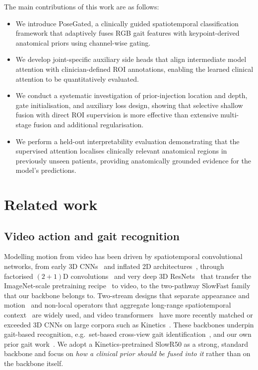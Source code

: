 \documentclass[review,authoryear,times]{elsarticle}
\begin{document}
The main contributions of this work are as follows:
\begin{itemize}
\item We introduce PoseGated, a clinically guided spatiotemporal classification framework that adaptively fuses RGB gait features with keypoint-derived anatomical priors using channel-wise gating.
\item We develop joint-specific auxiliary side heads that align intermediate model attention with clinician-defined ROI annotations, enabling the learned clinical attention to be quantitatively evaluated.
\item We conduct a systematic investigation of prior-injection location and depth, gate initialisation, and auxiliary loss design, showing that selective shallow fusion with direct ROI supervision is more effective than extensive multi-stage fusion and additional regularisation.
\item We perform a held-out interpretability evaluation demonstrating that the supervised attention localises clinically relevant anatomical regions in previously unseen patients, providing anatomically grounded evidence for the model's predictions.
\end{itemize}

\section{Related work}
\label{sec:related}

\subsection{Video action and gait recognition}
Modelling motion from video has been driven by spatiotemporal
convolutional networks, from early {3D} CNNs~\citep{tran2015c3d} and inflated
{2D} architectures~\citep{carreira2017i3d}, through factorised
$(2\!+\!1)$D convolutions~\citep{tran2018closer} and very deep {3D}
ResNets~\citep{hara2018can} that transfer the {ImageNet}-scale pretraining
recipe~\citep{deng2009imagenet} to video, to the two-pathway {SlowFast}
family~\citep{feichtenhofer2019slowfast} that our backbone belongs to. Two-stream
designs that separate appearance and motion~\citep{simonyan2014twostream} and
non-local operators that aggregate long-range spatiotemporal
context~\citep{wang2018nonlocal} are widely used, and video
transformers~\citep{arnab2021vivit,bertasius2021timesformer} have more recently
matched or exceeded {3D} CNNs on large corpora such as
{Kinetics}~\citep{kay2017kinetics}. These backbones underpin gait-based
recognition, e.g.\ set-based cross-view gait
identification~\citep{chao2019gaitset}, and our own prior gait
work~\citep{chen2023two,chen2024phasemix}. We adopt a {Kinetics}-pretrained
{SlowR50} as a strong, standard backbone and focus on \emph{how a clinical prior
should be fused into it} rather than on the backbone itself.
\end{document}
